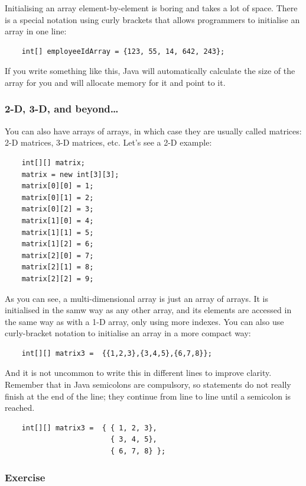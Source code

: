 Initialising an array element-by-element is boring and takes a lot of
space. There is a special notation using curly brackets that allows
programmers to initialise an array in one line: 

\begin{verbatim}
    int[] employeeIdArray = {123, 55, 14, 642, 243};
\end{verbatim}

If you write something like this, Java will automatically calculate
the size of the array for you and will allocate memory for it and
point to it. 

\subsubsection*{2-D, 3-D, and beyond\ldots}
\label{sec:2d-3d-beyondldots}

You can also have arrays of arrays, in which case they are usually
called matrices: 2-D matrices, 3-D matrices, etc. Let's see a 2-D
example: 

\begin{verbatim}
    int[][] matrix;
    matrix = new int[3][3];
    matrix[0][0] = 1;
    matrix[0][1] = 2;
    matrix[0][2] = 3;
    matrix[1][0] = 4;
    matrix[1][1] = 5;
    matrix[1][2] = 6;
    matrix[2][0] = 7;
    matrix[2][1] = 8;
    matrix[2][2] = 9;
\end{verbatim}

As you can see, a multi-dimensional array is just an array of
arrays. It is initialised in the samw way as any other array, and its
elements are accessed in the same way as with a 1-D array, only using
more indexes. You can also use curly-bracket notation to initialise an
array in a more compact way: 

\begin{verbatim}
    int[][] matrix3 =  {{1,2,3},{3,4,5},{6,7,8}};
\end{verbatim}

And it is not uncommon to write this in different lines to improve
clarity. Remember that in Java semicolons are compulsory, so
statements do not really finish at the end of the line; they continue
from line to line until a semicolon is reached. 

\begin{verbatim}
    int[][] matrix3 =  { { 1, 2, 3},
                         { 3, 4, 5},
                         { 6, 7, 8} };
\end{verbatim}

\subsubsection{Exercise}
\label{sec:exercisejfjfj}

